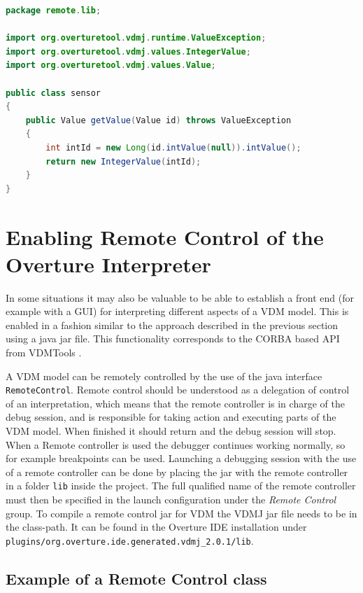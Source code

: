 \documentclass{overturerepchap}
\begin{document}
\begin{lstlisting}[language=JAVA,label=remoteSensorJava,caption=Remote sensor Java class,captionpos=b]
package remote.lib;

import org.overturetool.vdmj.runtime.ValueException;
import org.overturetool.vdmj.values.IntegerValue;
import org.overturetool.vdmj.values.Value;

public class sensor
{
	public Value getValue(Value id) throws ValueException
	{
		int intId = new Long(id.intValue(null)).intValue();
		return new IntegerValue(intId);
	}
}
\end{lstlisting}

\chapter{Enabling Remote Control of the Overture
  Interpreter}\label{sec:remote}

In some situations it may also be valuable to be able to establish a
front end (for example with a GUI) for interpreting different aspects
of a VDM model. This is enabled in a fashion similar to the approach described in the 
previous section using a java jar file. This functionality corresponds
to the CORBA based API from VDMTools \cite{APIMan}.

A VDM model can be remotely controlled by the use of the java interface
\texttt{RemoteControl}. Remote control should be understood as a
delegation of control of an interpretation, which means that the remote
controller is in charge of the debug session, and is responsible for taking
action and executing parts of the VDM model. When finished it should
return and the debug session will stop. When a Remote controller is
used the debugger continues working normally, so for example breakpoints can be
used. Launching a debugging session with the use of a remote
controller can be done by placing the jar with the remote controller
in a folder \texttt{lib} inside the project. The full
qualified name of the remote controller must then be specified in the launch configuration
under the \textit{Remote Control} group.  To compile a remote control
jar for VDM the VDMJ jar file needs to be in the class-path. It can be found
in the Overture IDE installation
under\\ \texttt{plugins/org.overture.ide.generated.vdmj\_2.0.1/lib}.

\section{Example of a Remote Control class}
\end{document}
